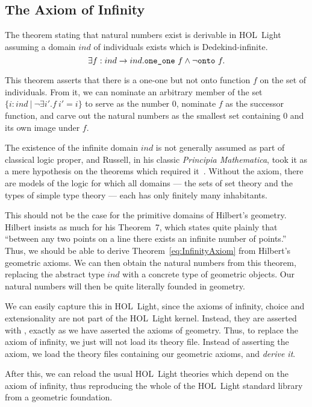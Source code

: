 \subsection{The Axiom of Infinity}
The theorem stating that natural numbers exist is derivable in HOL~Light assuming a domain $ind$ of individuals exists which is Dedekind-infinite.
\begin{equation}\label{eq:InfinityAxiom}
  \exists f : ind\rightarrow ind. \texttt{one\_one}\ f \wedge \neg\texttt{onto}\ f.
\end{equation}

This theorem asserts that there is a one-one but not onto function $f$ on the set of individuals. From it, we can nominate an arbitrary member of the set \mbox{$\{ i : ind\ \vert\ \neg\exists i'. f\ i' = i \}$} to serve as the number $0$, nominate $f$ as the successor function, and carve out the natural numbers as the smallest set containing $0$ and its own image under $f$.

The existence of the infinite domain $ind$ is not generally assumed as part of classical logic proper, and Russell, in his classic \emph{Principia Mathematica}, took it as a mere hypothesis on the theorems which required it~\cite{LogicismRevisited}. Without the axiom, there are models of the logic for which all domains --- the sets of set theory and the types of simple type theory --- each has only finitely many inhabitants.

This should not be the case for the primitive domains of Hilbert's geometry. Hilbert insists as much for his Theorem~7, which states quite plainly that ``between any two points on a line there exists an infinite number of points.'' Thus, we should be able to derive Theorem~\ref{eq:InfinityAxiom} from Hilbert's geometric axioms. We can then obtain the natural numbers from this theorem, replacing the abstract type $ind$ with a concrete type of geometric objects. Our natural numbers will then be quite literally founded in geometry.

We can easily capture this in HOL~Light, since the axioms of infinity, choice and extensionality are not part of the HOL~Light kernel. Instead, they are asserted with , exactly as we have asserted the axioms of geometry. Thus, to replace the axiom of infinity, we just will not load its theory file. Instead of asserting the axiom, we load the theory files containing our geometric axioms, and \emph{derive it}. 

After this, we can reload the usual HOL~Light theories which depend on the axiom of infinity, thus reproducing the whole of the HOL~Light standard library from a geometric foundation.

